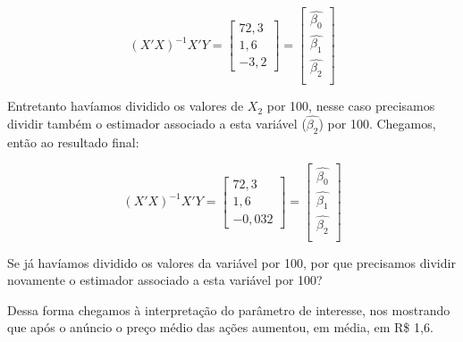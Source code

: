 \documentclass[]{ufpe-exercises}
\begin{document}
\begin{questions}
\begin{parts}
\begin{solution}
			\[
				(X'X)^{-1}X'Y =
				\begin{bmatrix}
					72,3 \\
					1,6  \\
					-3,2
				\end{bmatrix} =
				\begin{bmatrix}
					\hat{\beta_0} \\
					\hat{\beta_1} \\
					\hat{\beta_2} \\
				\end{bmatrix}
			\]

			Entretanto havíamos dividido os valores de \(X_2\) por 100, nesse caso precisamos dividir também o estimador associado a esta variável (\(\hat{\beta_2}\)) por 100. Chegamos, então ao resultado final:

			\[
				(X'X)^{-1}X'Y =
				\begin{bmatrix}
					72,3 \\
					1,6  \\
					-0,032
				\end{bmatrix} =
				\begin{bmatrix}
					\hat{\beta_0} \\
					\hat{\beta_1} \\
					\hat{\beta_2} \\
				\end{bmatrix}
			\]

			\begin{tcolorbox}[colback=red!5!white,colframe=red!75!black,title=Atenção]
				Se já havíamos dividido os valores da variável por 100, por que precisamos dividir novamente o estimador associado a esta variável por 100?
			\end{tcolorbox}

			Dessa forma chegamos à interpretação do parâmetro de interesse, nos mostrando que após o anúncio o preço médio das ações aumentou, em média, em R\$ 1,6.
		\end{solution}
	\end{parts}

\end{questions}
\end{document}

